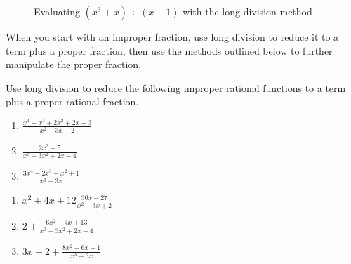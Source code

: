 \begin{figure}[htbp]
\centering
    \caption{Evaluating $(x^3 + x) \div (x - 1)$ with the long division method}
    \label{polylongdiv}
\end{figure}

When you start with an improper fraction, use long division to reduce it to a 
term plus a proper fraction, then use the methods outlined below to further 
manipulate the proper fraction. 

\begin{Exercise}[label = improper]
Use long division to reduce the following improper rational functions to a 
term plus a proper rational fraction.
\begin{enumerate}
\item $\frac{x^4 + x^3 + 2x^2 + 2x - 3}{x^2 - 3x + 2}$
\item $\frac{2x^3 + 5}{x^3 - 3x^2 + 2x - 4}$
\item $\frac{3x^4 - 2x^3 - x^2 + 1}{x^3 - 3x}$
\end{enumerate}
\end{Exercise}

\begin{Answer}[ref = improper]
\begin{enumerate}
\item $x^2 + 4x + 12 \frac{30x - 27}{x^2 - 3x + 2}$
\item $2 + \frac{6x^2 - 4x + 13}{x^3 - 3x^2 + 2x - 4}$
\item $3x - 2 + \frac{8x^2 - 6x + 1}{x^3 - 3x}$
\end{enumerate}
\end{Answer}

